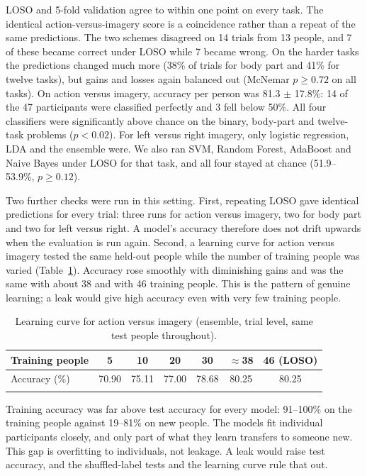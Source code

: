 \documentclass[pdflatex,sn-mathphys-num]{sn-jnl}%
\theoremstyle{thmstyleone}%
\theoremstyle{thmstyletwo}%
\theoremstyle{thmstylethree}%
\begin{document}
LOSO and 5-fold validation agree to within one point on every task. The identical action-versus-imagery score is a coincidence rather than a repeat of the same predictions. The two schemes disagreed on 14 trials from 13 people, and 7 of these became correct under LOSO while 7 became wrong. On the harder tasks the predictions changed much more (38\% of trials for body part and 41\% for twelve tasks), but gains and losses again balanced out (McNemar $p \ge 0.72$ on all tasks). On action versus imagery, accuracy per person was 81.3 $\pm$ 17.8\%: 14 of the 47 participants were classified perfectly and 3 fell below 50\%. All four classifiers were significantly above chance on the binary, body-part and twelve-task problems ($p < 0.02$). For left versus right imagery, only logistic regression, LDA and the ensemble were. We also ran SVM, Random Forest, AdaBoost and Naive Bayes under LOSO for that task, and all four stayed at chance (51.9--53.9\%, $p \ge 0.12$).

Two further checks were run in this setting. First, repeating LOSO gave identical predictions for every trial: three runs for action versus imagery, two for body part and two for left versus right. A model's accuracy therefore does not drift upwards when the evaluation is run again. Second, a learning curve for action versus imagery tested the same held-out people while the number of training people was varied (Table~\ref{tab:lcurve}). Accuracy rose smoothly with diminishing gains and was the same with about 38 and with 46 training people. This is the pattern of genuine learning; a leak would give high accuracy even with very few training people.

\begin{table}[htbp]
\centering
\caption{Learning curve for action versus imagery (ensemble, trial level, same test people throughout).}
\label{tab:lcurve}
\footnotesize
\begin{tabular}{@{}lcccccc@{}}
\toprule
Training people & 5 & 10 & 20 & 30 & $\approx$38 & 46 (LOSO) \\
\midrule
Accuracy (\%) & 70.90 & 75.11 & 77.00 & 78.68 & 80.25 & 80.25 \\
\botrule
\end{tabular}
\end{table}

Training accuracy was far above test accuracy for every model: 91--100\% on the training people against 19--81\% on new people. The models fit individual participants closely, and only part of what they learn transfers to someone new. This gap is overfitting to individuals, not leakage. A leak would raise test accuracy, and the shuffled-label tests and the learning curve rule that out.
\end{document}
